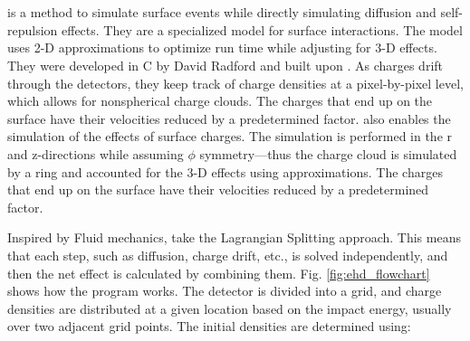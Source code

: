 


\section{{\ehd}}
{\ehd} is a method to simulate surface events while directly simulating diffusion and self-repulsion effects. They are a specialized model for surface interactions. The model uses 2-D approximations to optimize run time while adjusting for 3-D effects. They were developed in C by David Radford and built upon {\siggen}. As charges drift through the detectors, they keep track of charge densities at a pixel-by-pixel level, which allows for nonspherical charge clouds. The charges that end up on the surface have their velocities reduced by a predetermined factor. {\ehd} also enables the simulation of the effects of surface charges. The simulation is performed in the r and z-directions while assuming $\phi$ symmetry—thus the charge cloud is simulated by a ring and accounted for the 3-D effects using approximations. The charges that end up on the surface have their velocities reduced by a predetermined factor.

Inspired by Fluid mechanics, {\ehd} take the Lagrangian Splitting approach. This means that each step, such as diffusion, charge drift, etc., is solved independently, and then the net effect is calculated by combining them. Fig. \ref{fig:ehd_flowchart} shows how the {\ehd} program works. The detector is divided into a grid, and charge densities are distributed at a given location based on the impact energy, usually over two adjacent grid points. The initial densities are determined using:

